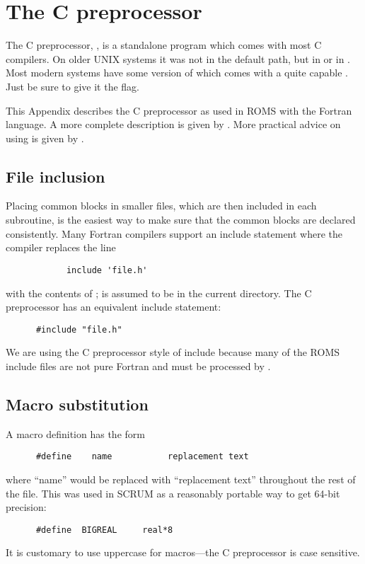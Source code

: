 \section{The C preprocessor}
\label{Cpp}

The C preprocessor, , is a standalone program which comes
with most C compilers. On older UNIX systems it was not in the default
path, but in  or in . Most modern systems
have some version of  which comes with a quite capable
. Just be sure to give it the  flag.

This Appendix describes the C preprocessor as used in ROMS with the
Fortran language.  A more complete description is given by
\citet{K&R}.  More practical advice on using
 is given by \citet{Hazard}.

\subsection{File inclusion}
Placing common blocks in smaller files, which are then included in each
subroutine, is the easiest way to make sure that the common blocks are
declared consistently.  Many Fortran compilers support an include
statement where the compiler replaces the line
\begin{verbatim}
            include 'file.h'
\end{verbatim}
with the contents of ;  is assumed
to be in the current directory.  The C preprocessor has an equivalent
include statement:
\begin{verbatim}
      #include "file.h"
\end{verbatim}
We are using the C preprocessor style of include because many of the
ROMS include files are not pure Fortran and must be processed by
.

\subsection{Macro substitution}
A macro definition has the form
\begin{verbatim}
      #define    name           replacement text
\end{verbatim}
where ``name'' would be replaced with ``replacement text''
throughout the rest of the file.  This was used in SCRUM as a
reasonably portable way to get 64-bit precision:
\begin{verbatim}
      #define  BIGREAL     real*8
\end{verbatim}
It is customary to use uppercase for  macros---the C
preprocessor is case sensitive.

